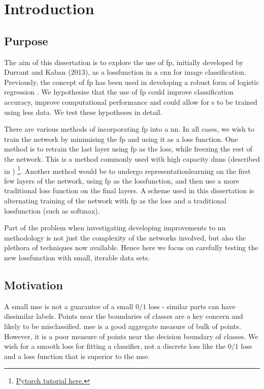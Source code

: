 \chapter{Introduction}

\section{Purpose}

The aim of this dissertation is to explore the use of  \gls{fp}, initially developed by Durrant and Kaban (2013)\cite{durrant2013sharp}, as a \gls{lossfunction} in a \gls{cnn} for image classification. Previously, the concept of  \gls{fp} has been used in developing a robust form of logistic regression \cite{label_noise}. We hypothesise that the use of  \gls{fp} could improve classification accuracy, improve computational performance and could allow for s to be trained using less data. We test these hypotheses in detail. 
\bigskip

There are various methods of incorporating  \gls{fp} into a  \gls{nn}. In all cases, we wish to train the network by minimising the \gls{fp} and using it as a loss function. One method is to retrain the last layer using  \gls{fp} as the loss, while freezing the rest of the network. This is a method commonly used with high capacity \gls{dnn}s (described in \cite{transfer_learning}) \footnote{\href{https://pytorch.org/tutorials/beginner/transfer_learning_tutorial.html}{Pytorch tutorial here.}}. Another method would be to undergo \gls{representationlearning} on the first few \gls{layer}s of the network, using \gls{fp} as the \gls{lossfunction}, and then use a more traditional loss function on the final layers. A scheme used in this dissertation is alternating training of the network with  \gls{fp} as the \gls{loss} and a traditional \gls{lossfunction} (such as \gls{softmax}). 
\bigskip

Part of the problem when investigating developing improvements to \gls{nn} methodology is not just the complexity of the networks involved, but also the plethora of techniques now available. Hence here we focus on carefully testing the new \gls{lossfunction} with small, iterable data sets.
\bigskip

\section{Motivation}

A small  \gls{mse} is not a guarantee of a small $0/1$ loss - similar parts can have dissimilar labels. Points near the boundaries of classes are a key concern and likely to be misclassified.  \gls{mse} is a good aggregate measure of bulk of points. However, it is a poor measure of points near the decision boundary of classes. We wish for a smooth loss for fitting a classifier, not a discrete loss like the $0/1$ loss and a loss function that is superior to the  \gls{mse}.

